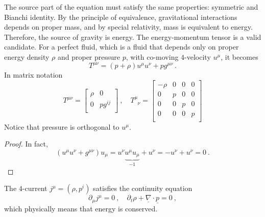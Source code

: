     The source part of the equation must satisfy the same properties: symmetric and Bianchi identity. By the principle of equivalence, gravitational interactions depends on proper mass, and by special relativity, mass is equivalent to energy. Therefore, the source of gravity is energy. The energy-momentum tensor is a valid candidate. For a perfect fluid, which is a fluid that depends only on proper energy density $\rho$ and proper pressure $p$, with co-moving $4$-velocity $u^\mu$, it becomes 
    \begin{equation*}
        T^{\mu\nu} = (p + \rho) u^\mu u^\nu + p g^{\mu\nu} ~.
    \end{equation*}
    In matrix notation 
    \begin{equation*}
        T^{\mu\nu} = \begin{bmatrix}
            \rho & 0 \\ 0 & p g^{ij} \\ 
        \end{bmatrix} ~, \quad T^\mu_{\phantom \mu \nu} = \begin{bmatrix}
            - \rho & 0 & 0 & 0 \\ 
            0 & p & 0 & 0 \\ 
            0 & 0 & p & 0 \\ 
            0 & 0 & 0 & p \\ 
        \end{bmatrix}
    \end{equation*}
    Notice that pressure is orthogonal to $u^\mu$.
    \begin{proof}
        In fact,
        \begin{equation*}
            (u^\mu u^\nu + g^{\mu\nu}) u_\mu = u^\nu \underbrace{u^\mu u_\mu}_{-1} + u^\nu = - u^\nu + u^\nu = 0 ~.
        \end{equation*}
    \end{proof}

    The $4$-current $j^\mu = (\rho, p^i)$ satisfies the continuity equation 
    \begin{equation*}
        \partial_\mu j^\mu = 0 ~, \quad \partial_t \rho + \underline \nabla \cdot \underline p = 0~,
    \end{equation*}
    which physically means that energy is conserved.

